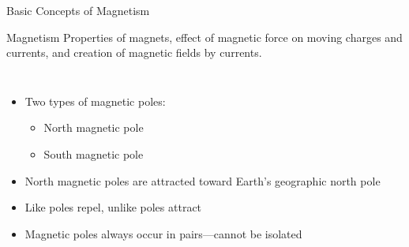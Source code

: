 \documentclass{beamer}
\begin{document}
\begin{frame}{Basic Concepts of Magnetism}
\begin{block}{Magnetism}
Properties of magnets, effect of magnetic force on moving charges and currents, and creation of magnetic fields by currents.
\end{block}

\begin{columns}
\begin{itemize}
\item Two types of magnetic poles:
  \begin{itemize}
  \item North magnetic pole
  \item South magnetic pole
  \end{itemize}
\item North magnetic poles are attracted toward Earth's geographic north pole
\item Like poles repel, unlike poles attract
\item Magnetic poles always occur in pairs—cannot be isolated
\end{itemize}


\end{columns}
\end{frame}
\end{document}
